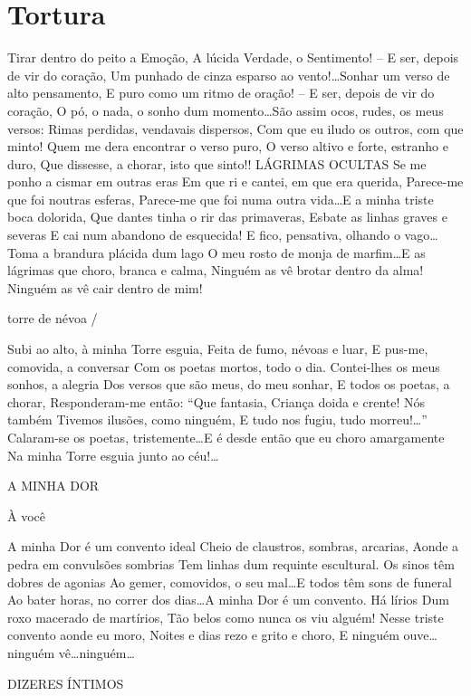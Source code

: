 \chapter{Tortura}
 
Tirar dentro do peito a Emoção, A lúcida Verdade, o Sentimento! – E ser, depois de vir do coração, Um punhado de cinza esparso ao vento!\ldots Sonhar um verso de alto pensamento, E puro como um ritmo de oração! – E ser, depois de vir do coração, O pó, o nada, o sonho dum momento\ldots São assim ocos, rudes, os meus versos: Rimas perdidas, vendavais dispersos, Com que eu iludo os outros, com que minto! Quem me dera encontrar o verso puro, O verso altivo e forte, estranho e duro, Que dissesse, a chorar, isto que sinto!! LÁGRIMAS OCULTAS Se me ponho a cismar em outras eras Em que ri e cantei, em que era querida, Parece-me que foi noutras esferas, Parece-me que foi numa outra vida\ldots E a minha triste boca dolorida, Que dantes tinha o rir das primaveras, Esbate as linhas graves e severas E cai num abandono de esquecida! E fico, pensativa, olhando o vago\ldots Toma a brandura plácida dum lago O meu rosto de monja de marfim\ldots E as lágrimas que choro, branca e calma, Ninguém as vê brotar dentro da alma! Ninguém as vê cair dentro de mim!

torre de névoa /

Subi ao alto, à minha Torre esguia, Feita de fumo, névoas e luar, E pus-me, comovida, a conversar Com os poetas mortos, todo o dia. Contei-lhes os meus sonhos, a alegria Dos versos que são meus, do meu sonhar, E todos os poetas, a chorar, Responderam-me então: “Que fantasia, Criança doida e crente! Nós também Tivemos ilusões, como ninguém, E tudo nos fugiu, tudo morreu!\ldots   ” Calaram-se os poetas, tristemente\ldots E é desde então que eu choro amargamente Na minha Torre esguia junto ao céu!\ldots 

A MINHA DOR 

À você 

A minha Dor é um convento ideal Cheio de claustros, sombras, arcarias, Aonde a pedra em convulsões sombrias Tem linhas dum requinte escultural. Os sinos têm dobres de agonias Ao gemer, comovidos, o seu mal\ldots E todos têm sons de funeral Ao bater horas, no correr dos dias\ldots A minha Dor é um convento. Há lírios Dum roxo macerado de martírios, Tão belos como nunca os viu alguém! Nesse triste convento aonde eu moro, Noites e dias rezo e grito e choro, E ninguém ouve\ldots ninguém vê\ldots ninguém\ldots 

DIZERES ÍNTIMOS

